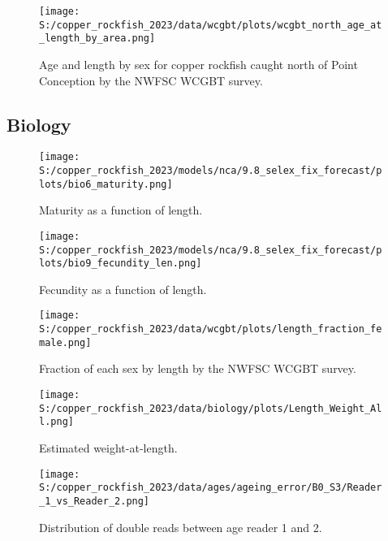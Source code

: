\documentclass[
  letterpaper,
]{article}
\begin{document}
\pagebreak

\begin{figure}
\centering
\texttt{[image: S:/copper\_rockfish\_2023/data/wcgbt/plots/wcgbt\_north\_age\_at\_length\_by\_area.png]}
\caption{Age and length by sex for copper rockfish caught north of Point Conception by the NWFSC WCGBT survey.\label{fig:wcgbt-len-age}}
\end{figure}

\pagebreak

\hypertarget{biology}{%
\subsection{Biology}\label{biology}}

\begin{figure}
\centering
\texttt{[image: S:/copper\_rockfish\_2023/models/nca/9.8\_selex\_fix\_forecast/plots/bio6\_maturity.png]}
\caption{Maturity as a function of length.\label{fig:maturity}}
\end{figure}

\pagebreak

\begin{figure}
\centering
\texttt{[image: S:/copper\_rockfish\_2023/models/nca/9.8\_selex\_fix\_forecast/plots/bio9\_fecundity\_len.png]}
\caption{Fecundity as a function of length.\label{fig:fecundity}}
\end{figure}

\pagebreak

\begin{figure}
\centering
\texttt{[image: S:/copper\_rockfish\_2023/data/wcgbt/plots/length\_fraction\_female.png]}
\caption{Fraction of each sex by length by the NWFSC WCGBT survey.\label{fig:frac-sex-len}}
\end{figure}

\pagebreak

\begin{figure}
\centering
\texttt{[image: S:/copper\_rockfish\_2023/data/biology/plots/Length\_Weight\_All.png]}
\caption{Estimated weight-at-length.\label{fig:est-len-wght}}
\end{figure}

\pagebreak

\begin{figure}
\centering
\texttt{[image: S:/copper\_rockfish\_2023/data/ages/ageing\_error/B0\_S3/Reader\_1\_vs\_Reader\_2.png]}
\caption{Distribution of double reads between age reader 1 and 2.\label{fig:age-error-dist}}
\end{figure}
\end{document}
